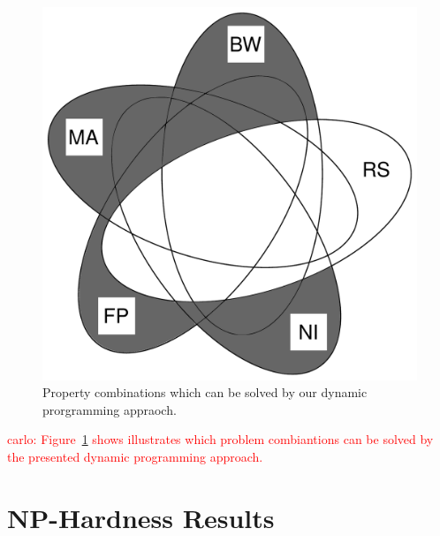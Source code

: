 \documentclass[9pt,twocolumn]{scrartcl}
\newcommand{\carlo}[1]{\textcolor{red}{carlo: #1}}
\begin{document}
\begin{figure}
\includegraphics[width=\columnwidth]{figs/venn_dp.pdf}
\caption{Property combinations which can be solved by our dynamic prorgramming
appraoch.}
\label{fig:venn_dp}
\end{figure}

\carlo{Figure~\ref{fig:venn_dp} shows illustrates which problem
combiantions can be solved by the presented dynamic programming
approach.}

\section{NP-Hardness Results}\label{sec:np}
\end{document}
